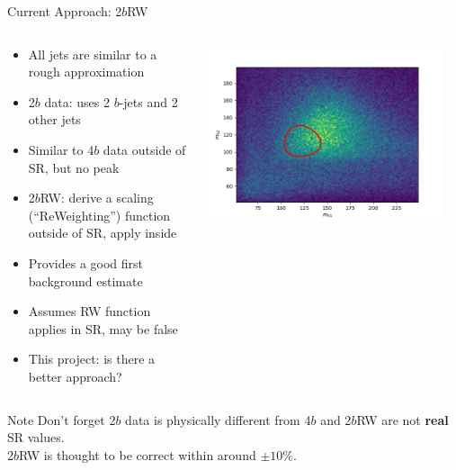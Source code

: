 \documentclass[10pt, aspectratio=169]{beamer}
\begin{document}
\begin{frame}{Current Approach: 2$b$RW}
  \begin{columns}[onlytextwidth]
    \begin{column}{0.6\textwidth}
      \begin{itemize}
        \item All jets are similar to a rough approximation
        \item \alert{2$b$ data}: uses 2 $b$-jets and 2 other jets
        \item Similar to 4$b$ data outside of SR, but no peak
        \item 2$b$RW: derive a scaling (``ReWeighting'') function outside of SR, apply inside
        \item Provides a good first background estimate
        \item Assumes RW function applies in SR, may be false
        \item \alert{This project}: is there a better approach?
      \end{itemize}
    \end{column}
    \begin{column}{0.4\textwidth}
      \includegraphics[width=\linewidth]{images/fullmassplane_2tag_data.png}\\
    \end{column}
​  \end{columns}
  \begin{alertblock}{Note}
    Don't forget 2$b$ data is physically different from 4$b$ and 2$b$RW are not \textbf{real} SR values.\\
    2$b$RW is thought to be correct within around $\pm 10\%$.
	\end{alertblock}
\end{frame}
\end{document}
